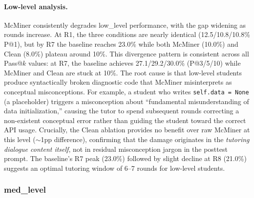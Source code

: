 \documentclass[11pt]{article}
\begin{document}
\paragraph{Low-level analysis.} McMiner consistently degrades low\_level performance, with the gap widening as rounds increase. At R1, the three conditions are nearly identical (12.5/10.8/10.8\% P@1), but by R7 the baseline reaches 23.0\% while both McMiner (10.0\%) and Clean (8.0\%) plateau around 10\%. This divergence pattern is consistent across all Pass@$k$ values: at R7, the baseline achieves 27.1/29.2/30.0\% (P@3/5/10) while McMiner and Clean are stuck at 10\%. The root cause is that low-level students produce syntactically broken diagnostic code that McMiner misinterprets as conceptual misconceptions. For example, a student who writes \texttt{self.data = None} (a placeholder) triggers a misconception about ``fundamental misunderstanding of data initialization,'' causing the tutor to spend subsequent rounds correcting a non-existent conceptual error rather than guiding the student toward the correct API usage. Crucially, the Clean ablation provides no benefit over raw McMiner at this level ($\sim$1pp difference), confirming that the damage originates in the \emph{tutoring dialogue content itself}, not in residual misconception jargon in the posttest prompt. The baseline's R7 peak (23.0\%) followed by slight decline at R8 (21.0\%) suggests an optimal tutoring window of 6--7 rounds for low-level students.

\subsubsection{med\_level}
\end{document}
